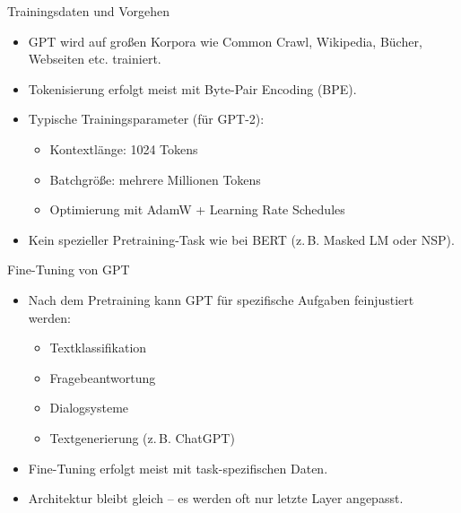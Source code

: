 \documentclass[aspectratio=1610, xcolor=dvipsnames, 9pt]{beamer}
\begin{document}
\begin{frame}{Trainingsdaten und Vorgehen}
  \begin{itemize}
      \item GPT wird auf großen Korpora wie Common Crawl, Wikipedia, Bücher, Webseiten etc. trainiert.
      \item Tokenisierung erfolgt meist mit Byte-Pair Encoding (BPE).
      \item Typische Trainingsparameter (für GPT-2):
      \begin{itemize}
          \item Kontextlänge: 1024 Tokens
          \item Batchgröße: mehrere Millionen Tokens
          \item Optimierung mit AdamW + Learning Rate Schedules
      \end{itemize}
      \item Kein spezieller Pretraining-Task wie bei BERT (z. B. Masked LM oder NSP).
  \end{itemize}
\end{frame}

\begin{frame}{Fine-Tuning von GPT}
  \begin{itemize}
      \item Nach dem Pretraining kann GPT für spezifische Aufgaben feinjustiert werden:
      \begin{itemize}
          \item Textklassifikation
          \item Fragebeantwortung
          \item Dialogsysteme
          \item Textgenerierung (z. B. ChatGPT)
      \end{itemize}
      \item Fine-Tuning erfolgt meist mit task-spezifischen Daten.
      \item Architektur bleibt gleich – es werden oft nur letzte Layer angepasst.
  \end{itemize}
\end{frame}
\end{document}
